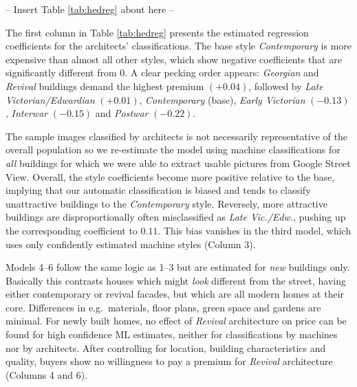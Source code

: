 \documentclass[]{article}
\begin{document}
\begin{center}
  -- Insert Table \ref{tab:hedreg} about here --
\end{center}

The first column in Table \ref{tab:hedreg} presents the estimated
regression coefficients for the architects' classifications. The base
style \emph{Contemporary} is more expensive than almost all other
styles, which show negative coefficients that are significantly
different from 0. A clear pecking order appears: \emph{Georgian} and
\emph{Revival} buildings demand the highest premium \((+0.04)\),
followed by \emph{Late Victorian/Edwardian} \((+0.01)\),
\emph{Contemporary} (base), \emph{Early Victorian} \((-0.13)\),
\emph{Interwar} \((-0.15)\) and \emph{Postwar} \((-0.22)\).

The sample images classified by architects is not necessarily
representative of the overall population so we re-estimate the model
using machine classifications for \emph{all} buildings for which we were
able to extract usable pictures from Google Street View. Overall, the
style coefficients become more positive relative to the base, implying
that our automatic classification is biased and tends to classify
unattractive buildings to the \emph{Contemporary} style. Reversely, more
attractive buildings are disproportionally often misclassified as
\emph{Late Vic./Edw.}, pushing up the corresponding coefficient to
\(0.11\). This bias vanishes in the third model, which uses only
confidently estimated machine styles (Column 3).

Models 4--6 follow the same logic as 1--3 but are estimated for
\emph{new} buildings only. Basically this contrasts houses which might
\emph{look} different from the street, having either contemporary or
revival facades, but which are all modern homes at their core.
Differences in e.g.~materials, floor plans, green space and gardens are
minimal. For newly built homes, no effect of \emph{Revival} architecture
on price can be found for high confidence ML estimates, neither for
classifications by machines nor by architects. After controlling for
location, building characteristics and quality, buyers show no
willingness to pay a premium for \emph{Revival} architecture (Columns 4
and 6).
\end{document}

